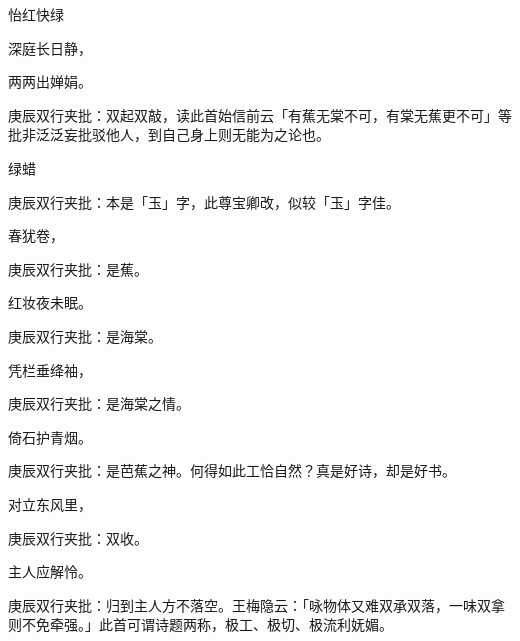 \begin{poem}
    \begin{pl}怡红快绿\end{pl}

    \begin{pl}深庭长日静，\end{pl}

    \begin{pl}两两出婵娟。\end{pl}\begin{note}庚辰双行夹批：双起双敲，读此首始信前云「有蕉无棠不可，有棠无蕉更不可」等批非泛泛妄批驳他人，到自己身上则无能为之论也。\end{note}

    \begin{pl}绿蜡\end{pl}\begin{note}庚辰双行夹批：本是「玉」字，此尊宝卿改，似较「玉」字佳。\end{note}\begin{pl}春犹卷，\end{pl}\begin{note}庚辰双行夹批：是蕉。\end{note}

    \begin{pl}红妆夜未眠。\end{pl}\begin{note}庚辰双行夹批：是海棠。\end{note}

    \begin{pl}凭栏垂绛袖，\end{pl}\begin{note}庚辰双行夹批：是海棠之情。\end{note}

    \begin{pl}倚石护青烟。\end{pl}\begin{note}庚辰双行夹批：是芭蕉之神。何得如此工恰自然？真是好诗，却是好书。\end{note}

    \begin{pl}对立东风里，\end{pl}\begin{note}庚辰双行夹批：双收。\end{note}

    \begin{pl}主人应解怜。\end{pl}\begin{note}庚辰双行夹批：归到主人方不落空。王梅隐云：「咏物体又难双承双落，一味双拿则不免牵强。」此首可谓诗题两称，极工、极切、极流利妩媚。\end{note}

\end{poem}

